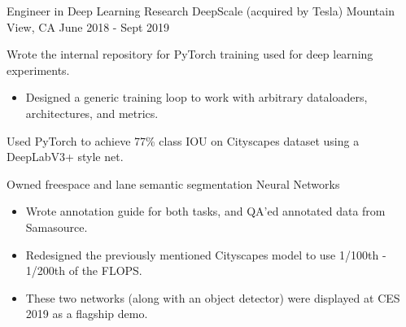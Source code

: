 \begin{cventries}
	\cventry
	{Engineer in Deep Learning Research}
	{DeepScale (acquired by Tesla)}
	{Mountain View, CA}
	{June 2018 - Sept 2019}
	{
		\begin{cvitems}
			\item Wrote the internal repository for PyTorch training used for deep learning experiments.
			\begin{itemize}
				\item Designed a generic training loop to work with arbitrary dataloaders, architectures, and metrics.
			\end{itemize}
			\item Used PyTorch to achieve 77\% class IOU on Cityscapes dataset using a DeepLabV3+ style net.
			\item Owned freespace and lane semantic segmentation Neural Networks
			\begin{itemize}
				\item Wrote annotation guide for both tasks, and QA'ed annotated data from Samasource.
				\item Redesigned the previously mentioned Cityscapes model to use 1/100th - 1/200th of the FLOPS.
				\item These two networks (along with an object detector) were displayed at CES 2019 as a flagship demo.
			\end{itemize}
		\end{cvitems}
	}


\end{cventries}
